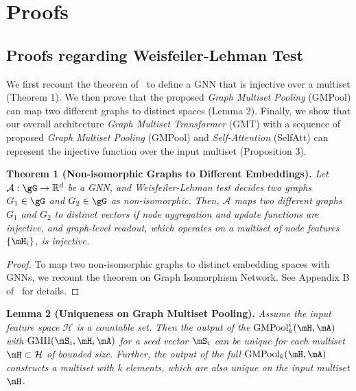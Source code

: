 \newpage

\appendix

\section{Proofs}

\subsection{Proofs regarding Weisfeiler-Lehman Test \label{appendix/wlproof}}
We first recount the theorem of~\citet{GIN} to define a GNN that is injective over a multiset (Theorem 1). We then prove that the proposed \emph{Graph Multiset Pooling} (GMPool) can map two different graphs to distinct spaces (Lemma 2). Finally, we show that our overall architecture \emph{Graph Multiset Transformer} (GMT) with a sequence of proposed \emph{Graph Multiset Pooling} (GMPool) and \emph{Self-Attention} (SelfAtt) can represent the injective function over the input multiset (Proposition 3).

\textbf{Theorem 1 (Non-isomorphic Graphs to Different Embeddings).} \emph{Let $\mathcal{A}: \gG \rightarrow \mathbb{R}^d$ be a GNN, and Weisfeiler-Lehman test decides two graphs $G_1 \in \gG$ and $G_2 \in \gG$ as non-isomorphic. Then, $\mathcal{A}$ maps two different graphs $G_1$ and $G_2$ to distinct vectors if node aggregation and update functions are injective, and graph-level readout, which operates on a multiset of node features $\left\{ \mH_i \right\}$, is injective.}

\begin{proof}
To map two non-isomorphic graphs to distinct embedding spaces with GNNs, we recount the theorem on Graph Isomorphism Network. See Appendix B of~\cite{GIN} for details.
\end{proof}

\textbf{Lemma 2 (Uniqueness on Graph Multiset Pooling).} \emph{Assume the input feature space $\mathcal{H}$ is a countable set. Then the output of the $\text{GMPool}_k^i(\mH, \mA)$ with $\text{GMH}(\mS_i, \mH, \mA)$ for a seed vector $\mS_i$ can be unique for each multiset $\mH \subset \mathcal{H}$ of bounded size. Further, the output of the full $\text{GMPool}_k(\mH, \mA)$ constructs a multiset with k elements, which are also unique on the input multiset $\mH$.}

